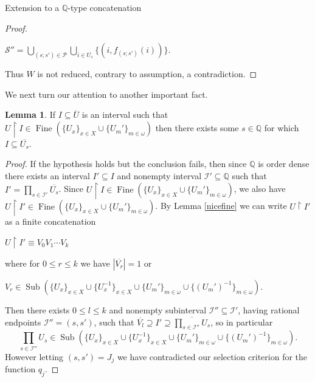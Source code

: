 \documentclass{amsart}
\theoremstyle{definition}\newtheorem{theorem}{Theorem}
\theoremstyle{definition}\newtheorem*{A}{Main Theorem}
\theoremstyle{definition}\newtheorem*{B}{Theorem \ref{elementaryequiv}}
\theoremstyle{definition}\newtheorem*{C}{Theorem \ref{continuous}}
\theoremstyle{definition}\newtheorem*{D}{Theorem \ref{bigisomorphism2}}
\theoremstyle{definition}\newtheorem{bigtheorem}{Main Theorem}
\numberwithin{theorem}{section}
\theoremstyle{definition}\newtheorem{corollary}[theorem]{Corollary}
\theoremstyle{definition}\newtheorem{proposition}[theorem]{Proposition}
\theoremstyle{definition}\newtheorem{definition}[theorem]{Definition}
\theoremstyle{definition}\newtheorem{question}[theorem]{Question}
\theoremstyle{definition}\newtheorem{example}[theorem]{Example}
\theoremstyle{definition}\newtheorem{remark}[theorem]{Remark}
\theoremstyle{definition}\newtheorem{note}[theorem]{Note}
\theoremstyle{definition}\newtheorem{lemma}[theorem]{Lemma}
\theoremstyle{definition}\newtheorem{fact}[theorem]{Fact}
\theoremstyle{definition}\newtheorem{define}[theorem]{Definition}
\theoremstyle{definition}\newtheorem{claim}[theorem]{Claim}
\theoremstyle{definition}\newtheorem{obs}[theorem]{Observation}
\theoremstyle{definition}\newtheorem{definitions}[theorem]{Definitions}
\newcommand{\Sub}{\operatorname{Sub}}
\newcommand{\Fine}{\operatorname{Fine}}
\begin{document}
\begin{section}{Extension to a $\mathbb{Q}$-type concatenation}
\begin{proof}
\begin{center}

$\mathcal{S}'' = \bigcup_{(s; s') \in \mathcal{P}} \bigcup_{i \in \overline{U_s}} \{(i, f_{(s; s')}(i))\}$.

\end{center}

\noindent Thus $W$ is not reduced, contrary to assumption, a contradiction.



\end{proof}

We next turn our attention to another important fact.

\begin{lemma}\label{notsofast}  If $I \subseteq \overline{U}$ is an interval such that $U \upharpoonright I \in \Fine(\{U_x\}_{x \in X} \cup \{U_m'\}_{m \in \omega})$ then there exists some $s \in \mathbb{Q}$ for which $I \subseteq \overline{U_s}$.
\end{lemma}

\begin{proof}  If the hypothesis holds but the conclusion fails, then since $\mathbb{Q}$ is order dense there exists an interval $I' \subseteq I$ and nonempty interval $\mathcal{I}' \subseteq \mathbb{Q}$ such that $I' = \prod_{s \in \mathcal{I}'} \overline{U_s}$.  Since $U \upharpoonright I \in \Fine(\{U_x\}_{x \in X} \cup \{U_m'\}_{m \in \omega})$, we also have $U \upharpoonright I' \in \Fine(\{U_x\}_{x \in X} \cup \{U_m'\}_{m \in \omega})$.  By Lemma \ref{nicefine} we can write $U \upharpoonright I'$ as a finite concatenation


\begin{center}

$U \upharpoonright I' \equiv V_0V_1\cdots V_k$

\end{center}

\noindent where for $0 \leq r \leq k$ we have $|\overline{V_r}| =1$ or 

\begin{center}

$V_r \in \Sub(\{U_x\}_{x \in X} \cup \{U_x^{-1}\}_{x \in X} \cup \{U_m'\}_{m \in \omega} \cup \{(U_m')^{-1}\}_{m \in \omega})$.

\end{center}

\noindent Then there exists $0 \leq l \leq k$ and nonempty subinterval $\mathcal{I}'' \subseteq \mathcal{I}'$, having rational endpoints $\mathcal{I}'' = (s, s')$, such that $\overline{V_l} \supseteq I' \supseteq \overline{\prod_{s \in \mathcal{I}''} U_s}$, so in particular $$\prod_{s \in \mathcal{I}''} U_s \in \Sub(\{U_x\}_{x \in X} \cup \{U_x^{-1}\}_{x \in X} \cup \{U_m'\}_{m \in \omega} \cup \{(U_m')^{-1}\}_{m \in \omega}).$$  However letting $(s, s') = J_j$ we have contradicted our selection criterion for the function $q_j$.
\end{proof}


\end{section}
\end{document}
